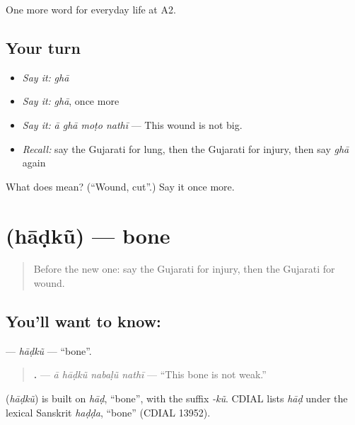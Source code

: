 \begin{grammarlens}[title={What you've built}]
One more word for everyday life at A2.
\end{grammarlens}

\subsection*{Your turn}
\begin{itemize}
\raggedright
  \item \emph{Say it:} \emph{ghā}
  \item \emph{Say it:} \emph{ghā}, once more
  \item \emph{Say it:} \emph{ā ghā moṭo nathī} — This wound is not big.
  \item \emph{Recall:} say the Gujarati for lung, then the Gujarati for injury, then say \emph{ghā} again
\end{itemize}

\begin{tcolorbox}[breakable,colback=teal!4,colframe=teal!35!black,title={Before you move on}]
What does  mean? (\textquotedblleft{}Wound, cut\textquotedblright{}.) Say it once more.
\end{tcolorbox}
\section[\texorpdfstring{\gu{હાડકું} (hāḍkũ)}{હાડકું (hāḍkũ)}]{ (hāḍkũ) — bone}

\label{lesson:GU-C227-hadku}



\begin{quote}
Before the new one: say the Gujarati for injury, then the Gujarati for wound.
\end{quote}

\subsection*{You'll want to know: }
\textbf{} — \emph{hāḍkũ} — \textquotedblleft{}bone\textquotedblright{}.

\begin{quote}
\textbf{   .} — \emph{ā hāḍkũ nabaḷũ nathī} — \textquotedblleft{}This bone is not weak.\textquotedblright{}
\end{quote}

\begin{cousinweb}
\textbf{} (\emph{hāḍkũ}) is built on \emph{hāḍ}, \textquotedblleft{}bone\textquotedblright{}, with the suffix \emph{-kũ}. CDIAL lists \emph{hāḍ} under the lexical Sanskrit \emph{haḍḍa}, \textquotedblleft{}bone\textquotedblright{} (CDIAL 13952).
\end{cousinweb}

